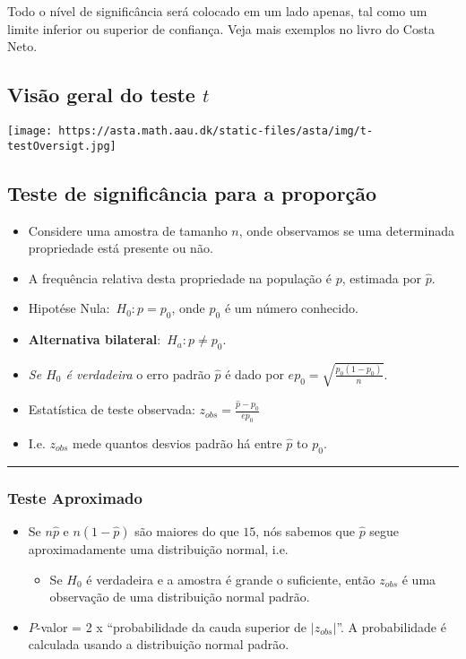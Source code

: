 \documentclass[]{article}
\providecommand{\tightlist}{%
  \setlength{\itemsep}{0pt}\setlength{\parskip}{0pt}}
\begin{document}
Todo o nível de significância será colocado em um lado apenas, tal como
um limite inferior ou superior de confiança. Veja mais exemplos no livro
do Costa Neto.

\subsection{\texorpdfstring{Visão geral do teste
\(t\)}{Visão geral do teste t}}\label{visao-geral-do-teste-t}

\texttt{[image: https://asta.math.aau.dk/static-files/asta/img/t-testOversigt.jpg]}

\subsection{Teste de significância para a
proporção}\label{teste-de-significancia-para-a-proporcao}

\begin{itemize}
\tightlist
\item
  Considere uma amostra de tamanho \(n\), onde observamos se uma
  determinada propriedade está presente ou não.
\item
  A frequência relativa desta propriedade na população é \(p\), estimada
  por \(\hat{p}\).
\item
  Hipotése Nula:~\(H_0: p = p_0\), onde \(p_0\) é um número conhecido.
\item
  \textbf{Alternativa bilateral}:~\(H_a: p \neq p_0\).
\item
  \emph{Se \(H_0\) é verdadeira} o erro padrão \(\hat{p}\) é dado por
  \(ep_0 = \sqrt{\frac{p_0(1-p_0)}{n}}\).
\item
  Estatística de teste observada: \(z_{obs} = \frac{\hat{p}-p_0}{ep_0}\)
\item
  I.e. \(z_{obs}\) mede quantos desvios padrão há entre \(\hat{p}\) to
  \(p_0\).
\end{itemize}

\begin{center}\rule{0.5\linewidth}{\linethickness}\end{center}

\subsubsection{Teste Aproximado}\label{teste-aproximado}

\begin{itemize}
\tightlist
\item
  Se \(n\hat{p}\) e \(n(1 - \hat{p})\) são maiores do que \(15\), nós
  sabemos que \(\hat{p}\) segue aproximadamente uma distribuição normal,
  i.e.

  \begin{itemize}
  \tightlist
  \item
    Se \(H_0\) é verdadeira e a amostra é grande o suficiente, então
    \(z_{obs}\) é uma observação de uma distribuição normal padrão.
  \end{itemize}
\item
  \(P\)-valor = 2 x ``probabilidade da cauda superior de
  \(|z_{obs}|\)''. A probabilidade é calculada usando a distribuição
  normal padrão.
\end{itemize}
\end{document}
